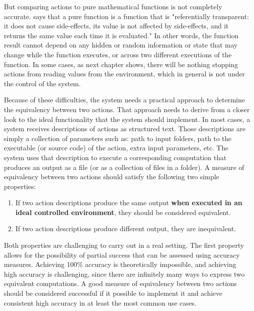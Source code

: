 But comparing actions to pure mathematical functions is not completely accurate.  \cite{gifford1986integrating} says that a pure function is a function that is "referentially transparent: it does not cause side-effects, its value is not affected by side-effects, and it returns the same value each time it is evaluated." In other words, the function result cannot depend on any hidden or random information or state that may change while the function executes, or across two different executions of the function. In some cases, as next chapter shows, there will be nothing stopping actions from reading values from the environment, which in general is not under the control of the system.

Because of these difficulties, the system needs a practical approach to determine the equivalency between two actions.  That approach needs to derive from a closer look to the ideal functionality that the system should implement.  In most cases, a system receives descriptions of actions as structured text.  Those descriptions are simply a collection of parameters such as: path to input folders, path to the executable (or source code) of the action, extra input parameters, etc. The system uses that description to execute a corresponding computation that produces an output as a file (or as a collection of files in a folder). A measure of equivalency between two actions should satisfy the following two simple properties:

\begin{enumerate}
\item If two action descriptions produce the same output \textbf{when executed in an ideal controlled environment}, they should be considered equivalent.
\item If two action descriptions produce different output, they are inequivalent.
\end{enumerate}

Both properties are challenging to carry out in a real setting. The first property allows for the possibility of partial success that can be assessed using accuracy measures.  Achieving 100\% accuracy is theoretically impossible, and achieving high accuracy is challenging, since there are infinitely many ways to express two equivalent computations.  A good measure of equivalency between two actions should be considered successful if it possible to implement it and achieve consistent high accuracy in at least the most common use cases.

